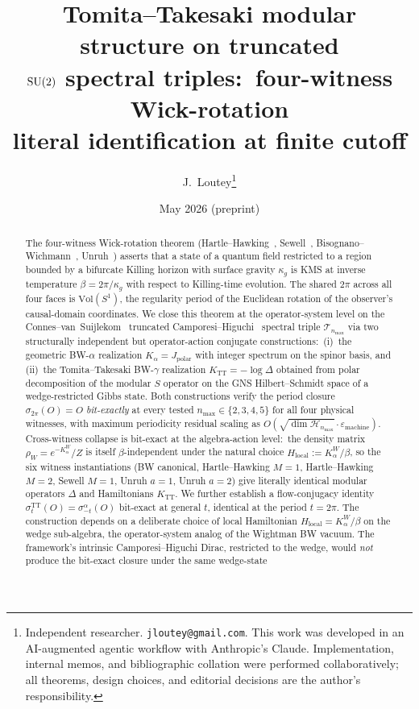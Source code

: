 \documentclass[11pt,a4paper]{article}
\title{Tomita--Takesaki modular structure on truncated\\
$\mathrm{SU}(2)$ spectral triples:\ four-witness Wick-rotation\\
literal identification at finite cutoff}
\author{J.~Loutey\thanks{Independent researcher. \texttt{jloutey@gmail.com}.
This work was developed in an AI-augmented agentic workflow with
Anthropic's Claude. Implementation, internal memos, and bibliographic
collation were performed collaboratively; all theorems, design choices,
and editorial decisions are the author's responsibility.}}
\date{May 2026 (preprint)}
\theoremstyle{plain}
\theoremstyle{definition}
\newcommand{\nmax}{n_{\max}}
\newcommand{\Hilb}{\mathcal{H}}
\newcommand{\Tcal}{\mathcal{T}}
\newcommand{\Vol}{\mathrm{Vol}}
\newcommand{\TT}{\mathrm{TT}}
\begin{document}
\maketitle

\begin{abstract}
The four-witness Wick-rotation theorem
(Hartle--Hawking~\cite{hartle_hawking1976}, Sewell~\cite{sewell1982},
Bisognano--Wichmann~\cite{bisognano_wichmann1976},
Unruh~\cite{unruh1976}) asserts that a state of a quantum field
restricted to a region bounded by a bifurcate Killing horizon with
surface gravity $\kappa_g$ is KMS at inverse temperature
$\beta = 2\pi/\kappa_g$ with respect to Killing-time evolution. The
shared $2\pi$ across all four faces is $\Vol(S^1)$, the regularity
period of the Euclidean rotation of the observer's causal-domain
coordinates. We close this theorem at the operator-system level on the
Connes--van~Suijlekom~\cite{connes_vs2021} truncated
Camporesi--Higuchi~\cite{camporesi_higuchi1996} spectral triple
$\Tcal_{\nmax}$ via two structurally independent but operator-action
conjugate constructions:\ (i)~the geometric BW-$\alpha$ realization
$K_\alpha = J_{\mathrm{polar}}$ with integer spectrum on the spinor
basis, and (ii)~the Tomita--Takesaki BW-$\gamma$ realization
$K_{\TT} = -\log \Delta$ obtained from polar decomposition of the
modular $S$ operator on the GNS Hilbert--Schmidt space of a
wedge-restricted Gibbs state. Both constructions verify the period
closure $\sigma_{2\pi}(O) = O$ \emph{bit-exactly} at every tested
$\nmax \in \{2, 3, 4, 5\}$ for all four physical witnesses, with
maximum periodicity residual scaling as
$O(\sqrt{\dim \Hilb_{\nmax}} \cdot \varepsilon_{\mathrm{machine}})$.
Cross-witness collapse is bit-exact at the algebra-action level:\ the
density matrix
$\rho_W = e^{-K_\alpha^W}/Z$ is itself $\beta$-independent under the
natural choice $H_{\mathrm{local}} := K_\alpha^W / \beta$, so the six
witness instantiations (BW canonical, Hartle--Hawking $M=1$,
Hartle--Hawking $M=2$, Sewell $M=1$, Unruh $a=1$, Unruh $a=2$) give
literally identical modular operators $\Delta$ and Hamiltonians
$K_{\TT}$. We further establish a flow-conjugacy identity
$\sigma_t^{\TT}(O) = \sigma_{-t}^{\alpha}(O)$ bit-exact at general $t$,
identical at the period $t = 2\pi$. The construction depends on a
deliberate choice of local Hamiltonian
$H_{\mathrm{local}} = K_\alpha^W / \beta$ on the wedge sub-algebra, the
operator-system analog of the Wightman BW vacuum. The framework's
intrinsic Camporesi--Higuchi Dirac, restricted to the wedge, would
\emph{not} produce the bit-exact closure under the same wedge-state

\end{abstract}
\end{document}
